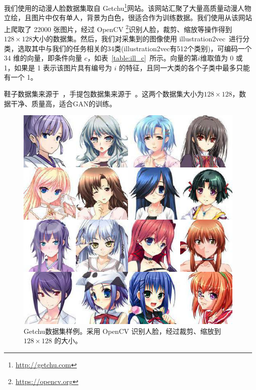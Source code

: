 \documentclass[a4paper,12pt,UTF8]{ctexart}
\newcommand{\kai}{\CJKfamily{zhkai}}	%
\begin{document}
我们使用的动漫人脸数据集取自 Getchu\footnote{\url{http://getchu.com}}网站。该网站汇聚了大量高质量动漫人物立绘，且图片中仅有单人，背景为白色，很适合作为训练数据。我们使用从该网站上爬取了 22000 张图片，经过 OpenCV \footnote{\url{https://opencv.org}}识别人脸，裁剪、缩放等操作得到 $128\times128$大小的数据集。然后，我们对采集到的图像使用 illustration2vec~\cite{Saito2015Illustration2Vec}进行分类，选取其中与我们的任务相关的34类(illustration2vec有512个类别)，可编码一个 34 维的向量，即条件向量 $c$，如表~\ref{table:ill_c}~所示。向量的第$i$维取值为 0 或 1，如果是 1 表示该图片具有编号为 $i$ 的特征，且同一大类的各个子类中最多只能有一个 1。

鞋子数据集来源于~\cite{finegrained}，手提包数据集来源于~\cite{Zhu2016Generative}。这两个数据集大小为$128 \times 128$，数据干净、质量高，适合GAN的训练。

\begin{figure}[H]
  \centering
  \includegraphics[width=0.5\linewidth]{figs/ex6.png}
  \caption{\kai Getchu数据集样例。采用 OpenCV 识别人脸，经过裁剪、缩放到 $128 \times 128$ 的大小。}
  \label{fig:getchu_disp}
\end{figure}
\end{document}
